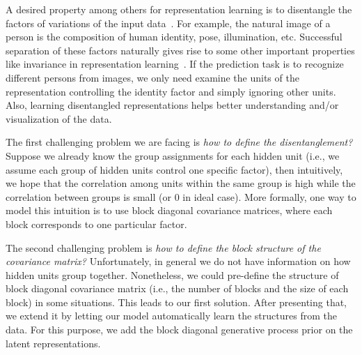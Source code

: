 A desired property among others for representation learning is to disentangle the factors of variations of the input data~\cite{bengio2013representation}.
For example, the natural image of a person is the composition of human identity, pose, illumination, etc. Successful separation of these factors naturally gives rise to some other important properties like invariance in representation learning~\cite{cohen2014learning}. If the prediction task is to recognize different persons from images, we only need examine the units of the representation controlling the identity factor and simply ignoring other units. Also, learning disentangled representations helps better understanding and/or visualization of the data.

The first challenging problem we are facing is \textit{how to define the disentanglement?} Suppose we already know the group assignments for each hidden unit (i.e., we assume each group of hidden units control one specific factor), then intuitively, we hope that the correlation among units within the same group is high while the correlation between groups is small (or 0 in ideal case). More formally, one way to model this intuition is to use block diagonal covariance matrices, where each block corresponds to one particular factor.

The second challenging problem is \textit{how to define the block structure of the covariance matrix?} Unfortunately, in general we do not have information on how hidden units group together. Nonetheless, we could pre-define the structure of block diagonal covariance matrix (i.e., the number of blocks and the size of each block) in some situations. This leads to our first solution. After presenting that, we extend it by letting our model automatically learn the structures from the data. For this purpose, we add the block diagonal generative process prior on the latent representations.


